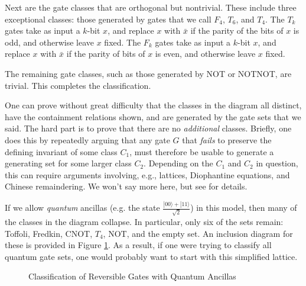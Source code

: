 \documentclass[11pt]{report}
\theoremstyle{plain}
\theoremstyle{definition}
\renewcommand{\ket}[1]{|#1\rangle}
\begin{document}
Next are the gate classes that are orthogonal but nontrivial. These include three exceptional classes: those generated by gates that we call $F_4$, $T_6$, and $T_4$.  The $T_k$ gates take as input a $k$-bit $x$, and replace $x$ with $\bar{x}$ if the parity of the bits of $x$ is odd, and otherwise leave $x$ fixed. The $F_k$ gates take as input a $k$-bit $x$, and replace $x$ with $\bar{x}$ if the parity of bits of $x$ is even, and otherwise leave $x$ fixed.

The remaining gate classes, such as those generated by NOT or NOTNOT, are trivial.  This completes the classification.

One can prove without great difficulty that the classes in the diagram all distinct, have the containment relations shown, and are generated by the gate sets that we said.  The hard part is to prove that there are no {\em additional} classes.  Briefly, one does this by repeatedly arguing that any gate $G$ that {\em fails} to preserve the defining invariant of some class $C_1$, must therefore be usable to generate a generating set for some larger class $C_2$.  Depending on the $C_1$ and $C_2$ in question, this can require arguments involving, e.g., lattices, Diophantine equations, and Chinese remaindering.  We won't say more here, but see \cite{ReversibleGates} for details.

If we allow {\em quantum} ancillas (e.g. the state $\frac{\ket{00}+\ket{11}}{\sqrt{2}}$) in this model, then many of the classes in the diagram collapse. In particular, only six of the sets remain: Toffoli, Fredkin, CNOT, $T_4$, NOT, and the empty set. An inclusion diagram for these is provided in Figure \ref{ReversibleFigureWithQuantumAncillas}. As a result, if one were trying to classify all quantum gate sets, one would probably want to start with this simplified lattice.

\begin{figure}[h]
\begin{center}
\end{center}
\caption{Classification of Reversible Gates with Quantum Ancillas}
\label{ReversibleFigureWithQuantumAncillas}
\end{figure}
\end{document}

